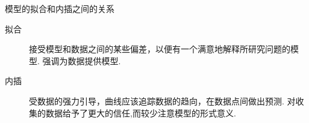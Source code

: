 \documentclass[UTF8]{ctexbeamer}
\begin{document}
\begin{frame}{模型的拟合和内插之间的关系}
  \begin{description}
  \item[拟合] 接受模型和数据之间的某些偏差，以便有一个满意地解释所研究问题的模型. 强调为数据提供模型.
  \item[内插] 受数据的强力引导，曲线应该追踪数据的趋向，在数据点间做出预测. 对收集的数据给予了更大的信任,而较少注意模型的形式意义.
  \end{description}

  \begin{figure}
    \centering

\end{figure}
\end{frame}
\end{document}
